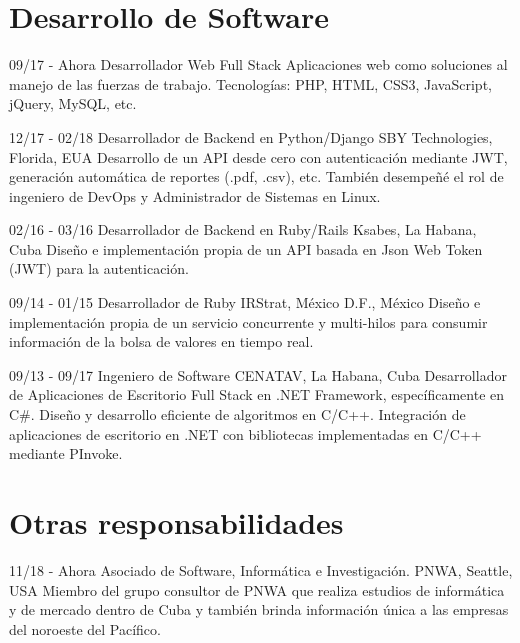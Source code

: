 \documentclass[]{friggeri-cv}
\begin{document}
\section{Desarrollo de Software}
\begin{entrylist}
  \entry
    {09/17 - Ahora}
    {Desarrollador Web Full Stack}
    {}
    {Aplicaciones web como soluciones al manejo de las fuerzas de trabajo. Tecnologías: PHP, HTML, CSS3, JavaScript, jQuery, MySQL, etc.\\} 
  
  \entry
    {12/17 - 02/18}
    {Desarrollador de Backend en Python/Django}
    {SBY Technologies, Florida, EUA}
    {Desarrollo de un API desde cero con autenticación mediante JWT, generación automática de reportes (.pdf, .csv), etc. También desempeñé el rol de ingeniero de DevOps y Administrador de Sistemas en Linux.\\}  
  
  \entry
    {02/16 - 03/16}
    {Desarrollador de Backend en Ruby/Rails}
    {Ksabes, La Habana, Cuba}
    {Diseño e implementación propia de un API basada en Json Web Token (JWT) para la autenticación.\\}
  
  \entry
    {09/14 - 01/15}
    {Desarrollador de Ruby}
    {IRStrat, México D.F., México}
    {Diseño e implementación propia de un servicio concurrente y multi-hilos para consumir información de la bolsa de valores en tiempo real.\\}

  \entry
    {09/13 - 09/17}
    {Ingeniero de Software}
    {CENATAV, La Habana, Cuba}
    {Desarrollador de Aplicaciones de Escritorio Full Stack en .NET Framework, específicamente en C\#. Diseño y desarrollo eficiente de algoritmos en C/C++. Integración de aplicaciones de escritorio en .NET con bibliotecas implementadas en C/C++ mediante PInvoke.\\}
\end{entrylist}

\pagebreak

\section{Otras responsabilidades}
\begin{entrylist}
  \entry
    {11/18 - Ahora}
    {Asociado de Software, Informática e Investigación.}
    {PNWA, Seattle, USA}
    {Miembro del grupo consultor de PNWA que realiza estudios de informática y de mercado dentro de Cuba y también brinda información única a las empresas del noroeste del Pacífico.}

\end{entrylist}
\end{document}
